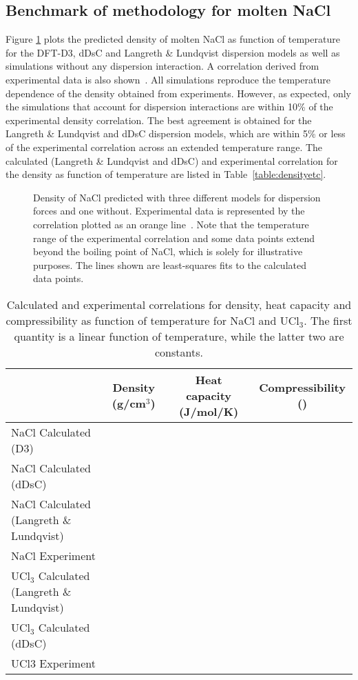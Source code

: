 \documentclass[preprint,3p,10pt,twocolumn,number,sort&compress]{elsarticle}
\begin{document}
\subsection{Benchmark of methodology for molten NaCl}
Figure \ref{fig:NaCldensity} plots the predicted density of molten NaCl as function of temperature for the DFT-D3, dDsC and Langreth \& Lundqvist dispersion models as well as simulations without any dispersion interaction. A correlation derived from experimental data is also shown~\cite{}. All simulations reproduce the temperature dependence of the density obtained from experiments. However, as expected, only the simulations that account for dispersion interactions are within 10\% of the experimental density correlation. The best agreement is obtained for the Langreth \& Lundqvist and dDsC dispersion models, which are within 5\% or less of the experimental correlation across an extended temperature range. The calculated (Langreth \& Lundqvist  and dDsC) and experimental correlation for the density as function of temperature are listed in Table~\ref{table:densityetc}.

\begin{figure}[htb]
\centering
\caption{Density of NaCl predicted with three different models for dispersion forces and one without. Experimental data is represented by the correlation plotted as an orange line~\cite{}. Note that the temperature range of the experimental correlation and some data points extend beyond the boiling point of NaCl, which is solely for illustrative purposes. The lines shown are least-squares fits to the calculated data points.} 
\label{fig:NaCldensity}
\end{figure}

\begin{table*}[hb!]
\centering
\begin{tabular}{lccc}
\hline
\hline
& Density (g/cm$^3$)	&Heat capacity (J/mol/K) &Compressibility ()\\
\hline
NaCl Calculated (D3)	& & &\\
NaCl Calculated (dDsC)	& & &\\
NaCl Calculated (Langreth \& Lundqvist)	& & &\\
NaCl Experiment	& & &\\
UCl$_3$ Calculated (Langreth \& Lundqvist) & & & \\	
UCl$_3$ Calculated (dDsC) & & & \\	
UCl3 Experiment	& & & \\
\hline
\hline
\end{tabular}
\caption{Calculated and experimental correlations for density, heat capacity and compressibility as function of temperature for NaCl and UCl$_3$. The first quantity is a linear function of temperature, while the latter two are constants.}
\label{table:NaCldensityetc}
\end{table*}
 
\end{document}
